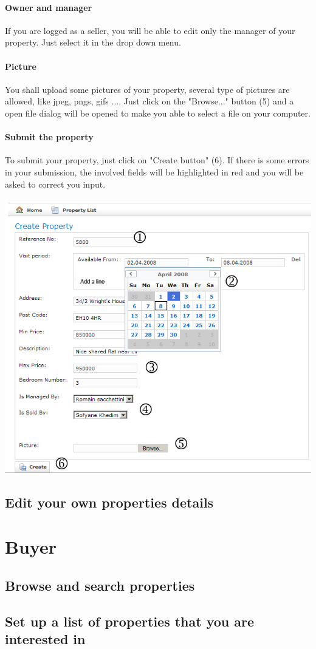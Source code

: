 \documentclass[a4paper,12pt]{article}
\begin{document}
\paragraph{Owner and manager}

If you are logged as a seller, you will be able to edit only the manager of your property. Just select it in the drop down menu.

\paragraph{Picture}

You shall upload some pictures of your property, several type of pictures are allowed, like jpeg, pngs, gifs ....
Just click on the "Browse..." button (5) and a open file dialog will be opened to make you able to select a file on your computer.

\paragraph{Submit the property}
To submit your property, just click on "Create button" (6). If there is some errors in your submission, the involved fields will be highlighted in red and you will be asked to correct you input.


\begin{center}
\includegraphics[scale=0.7]{pics/step_by_step.jpg}
\end{center}
\subsection{Edit your own properties details}

\section{Buyer}
\subsection{Browse and search properties}
\subsection{Set up a list of properties that you are interested in}
\end{document}
